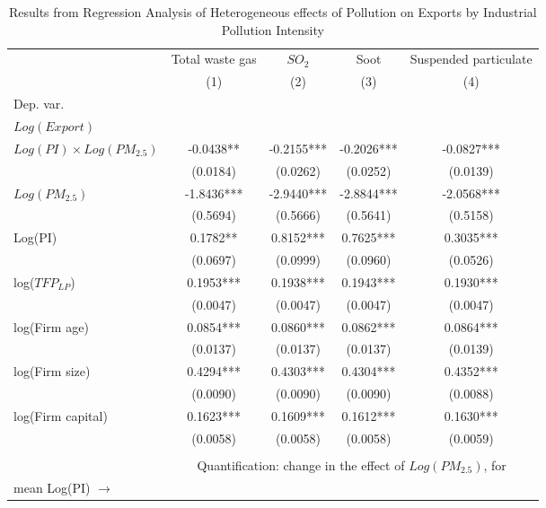 \documentclass[12pt]{article}
\begin{document}
  \begin{table}[H]\centering
    \caption{Results from Regression Analysis of Heterogeneous effects of Pollution on Exports by Industrial Pollution Intensity}\label{tab:hetero_PI}
    \begin{tabular}{l*{4}{c}}
      \hline\hline
      &\multicolumn{1}{c}{Total waste gas}&\multicolumn{1}{c}{$SO_{2}$}&\multicolumn{1}{c}{Soot}&\multicolumn{1}{c}{Suspended particulate}\\
      &\multicolumn{1}{c}{(1)}&\multicolumn{1}{c}{(2)}&\multicolumn{1}{c}{(3)}&\multicolumn{1}{c}{(4)}\\
      Dep. var. &&&&\\
      $Log(Export)$ &&&&\\
      \hline
      $Log(PI) \times Log(PM_{2.5})$ &-0.0438**&-0.2155***&-0.2026***&-0.0827***\\
                                    &(0.0184)&(0.0262)&(0.0252)&(0.0139)\\
      $Log(PM_{2.5})$               &-1.8436***&-2.9440***&-2.8844***&-2.0568***\\
                                    &(0.5694)&(0.5666)&(0.5641)&(0.5158)\\  
      Log(PI)                       &0.1782**&0.8152***&0.7625***&0.3035***\\ 
                                    &(0.0697)&(0.0999)&(0.0960)&(0.0526)\\   
      log($TFP_{LP}$)  &     0.1953***&0.1938***&0.1943***&0.1930***\\
                       &(0.0047)&(0.0047)&(0.0047)&(0.0047)\\
      log(Firm age)       &     0.0854***&0.0860***&0.0862***&0.0864***\\
                          &      (0.0137)&(0.0137)&(0.0137)&(0.0139)\\        
      log(Firm size) &0.4294***&0.4303***&0.4304***&0.4352***\\
                     &      (0.0090)&(0.0090)&(0.0090)&(0.0088)\\
      log(Firm capital)  &      0.1623***&0.1609***&0.1612***&0.1630***\\
                         &      (0.0058)&(0.0058)& (0.0058)&(0.0059)\\
                         &&&&\\
                         &\multicolumn{4}{c}{Quantification: change in the effect of $Log(PM_{2.5})$, for}\\ 
      mean  Log(PI) $\rightarrow$       &&&&\\ 

\end{tabular}
\end{table}
\end{document}
